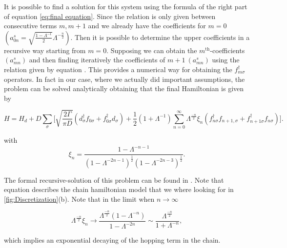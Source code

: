 It is possible to find a solution for this system using the formula of
the right part of equation \ref{eq:final equation}. Since the relation
is only given between consecutive terms $m,m+1$ and we already have
the coefficients for $m=0$ $\left(a_{0n}^{s}=\sqrt{\frac{1-\Lambda^{-1}}{2}}\Lambda^{-\frac{n}{2}}\right).$
Then it is possible to determine the upper coefficients in a recursive way starting
from $m=0$. Supposing we can obtain the $m^{\mbox{th}}$-coefficients
$(a_{mn}^{s})$ and then finding iteratively the coefficients of $m+1\ (a_{mn}^{s})$
using the relation given by equation .
This provides a numerical way for obtaining the $f_{m\sigma}^{\dagger}$
operators. In fact in our case, where we actually did important assumptions,
the problem can be solved analytically obtaining that the final Hamiltonian
is given by 

\begin{equation}
H=H_{d}+D\sum_{\sigma}\Biggl[\sqrt{\frac{2\Gamma}{\pi D}}\left(d_{\sigma}^{\dagger}f_{0\sigma}+f_{0\sigma}^{\dagger}d_{\sigma}\right)+\frac{1}{2}\left(1+\Lambda^{-1}\right)\sum_{n=0}^{\infty}\Lambda^{\frac{-n}{2}}\xi_{n}\left(f_{n\sigma}^{\dagger}f_{n+1,\sigma}+f_{n+1\sigma}^{\dagger}f_{n\sigma}\right)\Biggr].\label{eq:chain-Hamiltonian}
\end{equation}


with 
\[
\xi_{n}=\frac{1-\Lambda^{-n-1}}{\left(1-\Lambda^{-2n-1}\right)^{\frac{1}{2}}\left(1-\Lambda^{-2n-3}\right)^{\frac{1}{2}}}.
\]


The formal recursive-solution of this problem can be found in \citep{bulla_numerical_2008}
. Note that equation  describes the
chain hamiltonian model that we where looking for in \ref{fig:Discretization}(b).
Note that in the limit when $n\longrightarrow\infty$ 

\[
\Lambda^{\frac{-n}{2}}\xi_{n}\longrightarrow\frac{\Lambda^{\frac{-n}{2}}\left(1-\Lambda^{-n}\right)}{1-\Lambda^{-2n}}\sim\frac{\Lambda^{\frac{-n}{2}}}{1+\Lambda^{-n}},
\]


which implies an exponential decaying of the hopping term in the chain. 





